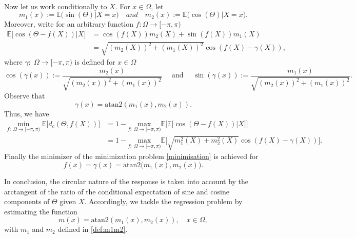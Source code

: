\documentclass[11pt,a4paper,openany]{article}
\newcommand{\Atan}{\mbox{atan2}}
\def\E{\mathbb{E}}
\begin{document}
\\
Now let us work conditionally to $X$. For $x\in\Omega$,  let
\begin{equation}\label{def:m1m2}
m_{1}(x) := \mathbb{E} \big( \sin (\Theta) | X=x\big)\quad and \quad m_{2}(x) := \mathbb{E} \big( \cos (\Theta) | X=x\big).
\end{equation}
Moreover, write for an arbitrary function $f: \Omega \rightarrow [-\pi,\pi) $
\begin{align*}
\mathbb{E} \big[ \cos (\Theta - f(X)) | X \big] &= \cos(f(X))m_{2}(X) + \sin(f(X))m_{1}(X)
\\
&=  \sqrt{(m_{2}(X))^{2} + (m_{1}(X))^{2} } \cos (f(X) - \gamma(X)) ,
\end{align*}
where $\gamma : \;\Omega \rightarrow [-\pi,\pi)$ is defined for $x \in \Omega$
\begin{equation*}
\cos(\gamma(x)) := \dfrac{m_{2}(x)}{\sqrt{(m_{2}(x))^{2} + (m_{1}(x))^{2} }}   \quad  \textrm{ and } \quad  \sin(\gamma(x)) := \dfrac{m_{1}(x)}{\sqrt{(m_{2}(x))^{2} + (m_{1}(x))^{2}} }.
\end{equation*}
Observe that 
$$\gamma(x) = \Atan ( m_{1}(x),m_{2}(x)).$$
Thus, we have
\begin{align*} \label{eq:m(X).given.by.atan2}
\underset{f: \;\Omega \rightarrow [-\pi,\pi) }{ \textrm{min} }  \; \mathbb{E} \big[ d_c(\Theta, f(X))  \big]
&=1- \underset{f: \; \Omega \rightarrow [-\pi,\pi) }{ \textrm{max} } \E\Big[\mathbb{E} \big[ \cos (\Theta - f(X)) | X \big] \Big]\\
&=1- \underset{f: \;\Omega \rightarrow [-\pi,\pi) }{ \textrm{max} } \E\Big[\sqrt{m_1^2(X)+m_2^2(X)}\cos (f(X) - \gamma(X))\Big].  
\end{align*}
Finally the minimizer of the minimization problem \eqref{minimisation} is achieved for 
$$f(x)=\gamma(x) = \Atan \big( m_{1}(x),m_{2}(x)\big).$$

In conclusion, the circular nature of the response is taken into account by the arctangent of the ratio of the conditional expectation of sine and cosine components of $\Theta$ given $X$.
Accordingly, we tackle the regression problem by estimating the function \begin{equation}
m(x) = \Atan (m_1(x), m_2(x)),\quad x\in \Omega,
\label{formula:regress-function.m}
\end{equation} 
with $m_1$ and $m_2$ defined in \eqref{def:m1m2}. 
\end{document}

